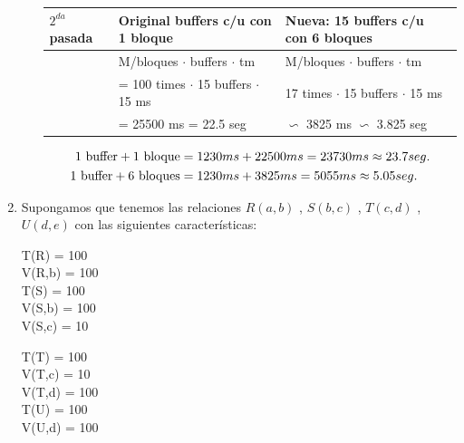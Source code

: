 \documentclass{templateNote}
\begin{document}
\begin{enumerate}
\begin{enumerate}[label=\alph*)]
        \begin{tabular}{|m{2cm}|m{6cm}|m{6cm}|}
            \hline
            $2^{da}$ pasada & Original \newline 15 buffers c/u con 1 bloque & Nueva: 15 buffers c/u con 6 bloques\\
            \hline
            & M/bloques $\cdot$ buffers $\cdot$ tm & M/bloques $\cdot$ buffers $\cdot$ tm \\
            & = 100 times $\cdot$ 15 buffers $\cdot$ 15 ms & 17 times $\cdot$ 15 buffers $\cdot$ 15 ms \\
            & = 25500 ms = 22.5 seg & $\backsim$ 3825 ms $\backsim$ 3.825 seg\\
            \hline
        \end{tabular}
        
        \begin{align*}
            1 \textnormal{ buffer} + 1 \textnormal{ bloque} &= 1230 ms + 22500 ms = 23730 ms \approx 23.7 seg.\\ %
            1 \textnormal{ buffer} + 6 \textnormal{ bloques} &= 1230 ms + 3825 ms = 5055 ms \approx 5.05 seg.\\ %
        \end{align*}
    \end{enumerate}

    \item Supongamos que tenemos las relaciones $R(a,b)$ , $S(b,c)$ , $T(c,d)$ , $U(d,e)$ con las siguientes características:
        
        \begin{center}
            \begin{minipage}{0.3\textwidth}
                T(R) = 100 \\
                V(R,b) = 100 \\
                T(S) = 100 \\
                V(S,b) = 100 \\
                V(S,c) = 10 \\
                \end{minipage}%
                \begin{minipage}{0.3\textwidth}
                T(T) = 100 \\
                V(T,c) = 10 \\
                V(T,d) = 100 \\
                T(U) = 100 \\
                V(U,d) = 100 \\
            \end{minipage}
        \end{center}    


\end{enumerate}
\end{document}

